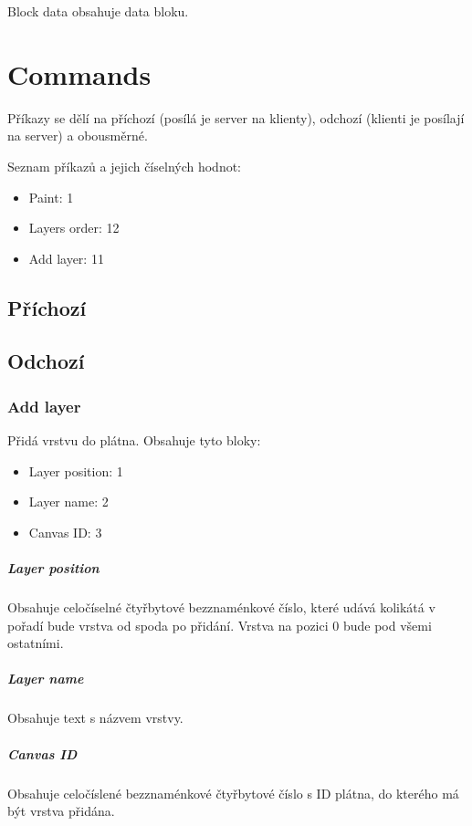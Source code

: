 \documentclass[12pt,oneside,a4paper]{report}
\begin{document}
Block data obsahuje data bloku.

\chapter{Commands}

Příkazy se dělí na příchozí (posílá je server na klienty), odchozí (klienti je posílají na server) a obousměrné.

Seznam příkazů a jejich číselných hodnot:

\begin{itemize}
	\item Paint: 1
	\item Layers order: 12
	\item Add layer: 11
\end{itemize}

\section{Příchozí}

\section{Odchozí}

\subsection{Add layer}

Přidá vrstvu do plátna. Obsahuje tyto bloky:

\begin{itemize}
	\item Layer position: 1
	\item Layer name: 2
	\item Canvas ID: 3
\end{itemize}

\paragraph{Layer position}
Obsahuje celočíselné čtyřbytové bezznaménkové číslo, které udává kolikátá v pořadí bude vrstva od spoda po přidání. Vrstva na pozici $0$ bude pod všemi ostatními.

\paragraph{Layer name}
Obsahuje text s názvem vrstvy.

\paragraph{Canvas ID}
Obsahuje celočíslené bezznaménkové čtyřbytové číslo s ID plátna, do kterého má být vrstva přidána.
\end{document}
